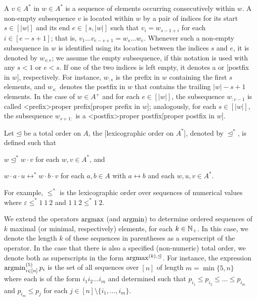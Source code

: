 \documentclass[../document.tex]{subfiles}
\begin{document}
    A  \(v \in A^*\) in \(w\in A^*\) is a sequence of elements occurring consecutively within \(w\).
    A non-empty subsequence \(v\) is located within \(w\) by a pair of indices for its start \(s \in [|w|]\) and its end \(e \in [s,|w|]\) such that \(v_i = w_{s-1+i}\) for each \(i \in [e-s+1]\); that is, \(v_1 \ldots v_{e-s+1} = w_s \ldots w_e\).
    Whenever such a non-empty subsequence in \(w\) is identified using its location between the indices \(s\) and \(e\), it is denoted by \(w_{s:e}\); we assume the empty subsequence, if this notation is used with any \(s < 1\) or \(e < s\).
    If one of the two indices is left empty, it denotes a  or [postfix in \(w\)], respectively.
    For instance, \(w_{:s}\) is the prefix in \(w\) containing the first \(s\) elements, and \(w_{s:}\) denotes the postfix in \(w\) that contains the trailing \(|w|-s+1\) elements.
    In the case of \(w\in A^+\) and for each \(e \in [|w|]\), the subsequence \(w_{:e-1}\) is called <prefix>{proper prefix}[proper prefix in \(w\)]; analogously, for each \(s\in [|w|]\), the subsequence \(w_{s+1:}\) is a <postfix>{proper postfix}[proper postfix in \(w\)].

    Let \(\unlhd\) be a total order on \(A\), the [lexicographic order on \(A^*\)], denoted by \(\unlhd^*\), is defined such that
    \begin{inparaenum}
        \item \(w \unlhd^* w \cdot v\) for each \(w, v \in A^*\), and
        \item \(w\cdot a\cdot u \rel^* w\cdot b\cdot v \) for each \(a,b \in A\) with \(a \rel b\) and each \(w,u,v \in A^*\).
    \end{inparaenum}
    For example, \(\leq^*\) is the lexicographic order over sequences of numerical values where \(\varepsilon \leq^* 1\:1\:2\) and \(1\:1\:2\leq^*1\:2\).
    
    We extend the operators \(\operatorname{arg max}\) (and \(\operatorname{arg min}\)) to determine ordered sequences of \(k\) maximal (or minimal, respectively) elements, for each \(k \in \mathbb{N}_+\).
    In this case, we denote the length \(k\) of these sequences in parentheses as a superscript of the operator.
    In the case that there is also a specified (non-numeric) total order, we denote both as superscripts in the form \(\operatorname{arg max}^{(k), \unlhd}\).
    For instance, the expression \(\operatorname{arg min}^{(5)}_{i \in [n]} p_i\) is the set of all sequences over \([n]\) of length \(m = \min \{5, n\}\) where each is of the form \(i_1 i_2 \ldots i_m\) and determined such that \(p_{i_1} \leq p_{i_2} \leq \ldots \leq p_{i_m}\) and \(p_{i_m} \leq p_j\) for each \(j \in [n]\setminus\{i_1,\ldots,i_m\}\).
\end{document}
